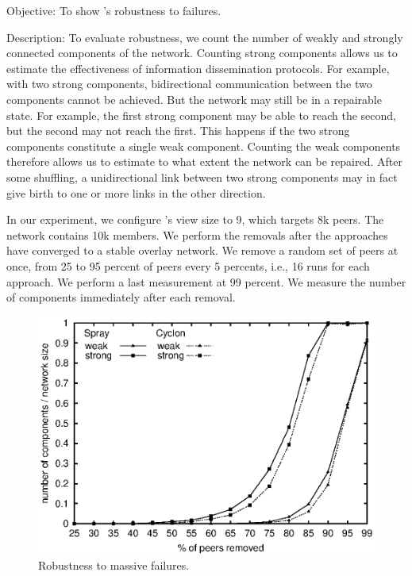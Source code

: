 \begin{asparadesc}
\item[Objective:] To show \SPRAY's robustness to failures.
\item[Description:] To evaluate robustness, we count the number of
  weakly and strongly connected components of the network. Counting
  strong components allows us to estimate the effectiveness of
  information dissemination protocols. For example, with two strong
  components, bidirectional communication between the two components
  cannot be achieved. But the network may still be in a repairable
  state.  For example, the first strong component may be able to reach
  the second, but the second may not reach the first. This happens if
  the two strong components constitute a single weak
  component. Counting the weak components therefore allows us to
  estimate to what extent the network can be repaired.  After some
  shuffling, a unidirectional link between two strong components may
  in fact give birth to one or more links in the other direction.

  In our experiment, we configure \CYCLON's view size to 9, which
  targets 8k peers. The network contains 10k members. We perform the
  removals after the approaches have converged to a stable overlay
  network. We remove a random set of peers at once, from 25 to 95 percent
  of peers every 5 percents, i.e., 16 runs for each approach. We
  perform a last measurement at 99 percent. We measure the number of
  components immediately after each removal.

\begin{figure}
  \centering
  \includegraphics[width=\SCALE\textwidth]{img/resilience.eps}
  \caption{\label{fig:resilience}Robustness to massive failures.}
\end{figure}


\end{asparadesc}

